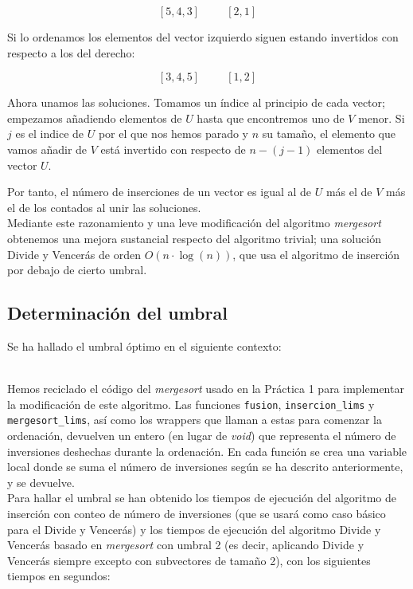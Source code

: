 \[[5,4,3] \hspace{1cm} [2,1]\]

Si lo ordenamos los elementos del vector izquierdo siguen estando invertidos con respecto a los del derecho:

\[[3,4,5] \hspace{1cm} [1,2]\]

Ahora unamos las soluciones. Tomamos un índice al principio de cada vector; empezamos añadiendo elementos de $U$ hasta que encontremos uno de $V$ menor. Si $j$ es el indice de $U$ por el que nos hemos parado y $n$ su tamaño, el elemento que vamos añadir de $V$ está invertido con respecto de $n-(j-1)$ elementos del vector $U$.

Por tanto, el número de inserciones de un vector es igual al de $U$ más el de $V$ más el de los contados al unir las soluciones. \\

Mediante este razonamiento y una leve modificación del algoritmo \textit{mergesort} obtenemos una mejora sustancial respecto del algoritmo trivial; una solución Divide y Vencerás de orden $O(n\cdot \log(n))$, que usa el algoritmo de inserción por debajo de cierto umbral.

\subsection{Determinación del umbral}

Se ha hallado el umbral óptimo en el siguiente contexto:

 \\

Hemos reciclado el código del \textit{mergesort} usado en la Práctica 1 para implementar la modificación de este algoritmo. Las funciones \texttt{fusion}, \texttt{insercion\_lims} y \texttt{mergesort\_lims}, así como los wrappers que llaman a estas para comenzar la ordenación, devuelven un entero (en lugar de \textit{void}) que representa el número de inversiones deshechas durante la ordenación. En cada función se crea una variable local donde se suma el número de inversiones según se ha descrito anteriormente, y se devuelve. \\

Para hallar el umbral se han obtenido los tiempos de ejecución del algoritmo de inserción con conteo de número de inversiones (que se usará como caso básico para el Divide y Vencerás) y los tiempos de ejecución del algoritmo Divide y Vencerás basado en \textit{mergesort} con umbral 2 (es decir, aplicando Divide y Vencerás siempre excepto con subvectores de tamaño 2), con los siguientes tiempos en segundos:


